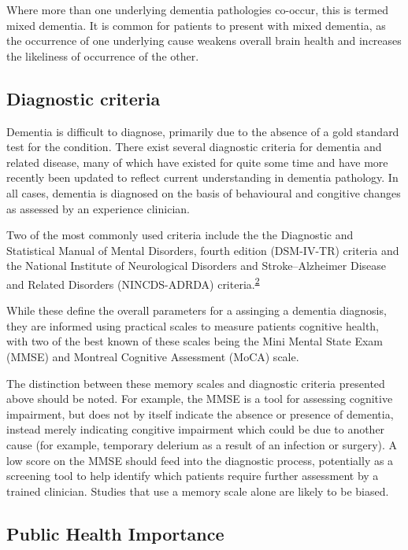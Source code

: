 \documentclass[a4paper, twoside]{templates/ociamthesis}
\begin{document}
Where more than one underlying dementia pathologies co-occur, this is termed mixed dementia. It is common for patients to present with mixed dementia, as the occurrence of one underlying cause weakens overall brain health and increases the likeliness of occurrence of the other.

\hypertarget{diagnostic-criteria}{%
\subsection{Diagnostic criteria}\label{diagnostic-criteria}}

Dementia is difficult to diagnose, primarily due to the absence of a gold standard test for the condition. There exist several diagnostic criteria for dementia and related disease, many of which have existed for quite some time and have more recently been updated to reflect current understanding in dementia pathology. In all cases, dementia is diagnosed on the basis of behavioural and congitive changes as assessed by an experience clinician.

Two of the most commonly used criteria include the the Diagnostic and Statistical Manual of Mental Disorders, fourth edition (DSM-IV-TR) criteria and the National Institute of Neurological Disorders and Stroke--Alzheimer Disease and Related Disorders (NINCDS-ADRDA) criteria.\textsuperscript{\protect\hyperlink{ref-dubois2007}{2}}

While these define the overall parameters for a assinging a dementia diagnosis, they are informed using practical scales to measure patients cognitive health, with two of the best known of these scales being the Mini Mental State Exam (MMSE) and Montreal Cognitive Assessment (MoCA) scale.

The distinction between these memory scales and diagnostic criteria presented above should be noted. For example, the MMSE is a tool for assessing cognitive impairment, but does not by itself indicate the absence or presence of dementia, instead merely indicating congitive impairment which could be due to another cause (for example, temporary delerium as a result of an infection or surgery).
A low score on the MMSE should feed into the diagnostic process, potentially as a screening tool to help identify which patients require further assessment by a trained clinician. Studies that use a memory scale alone are likely to be biased.

\hypertarget{public-health-importance}{%
\subsection{Public Health Importance}\label{public-health-importance}}
\end{document}
